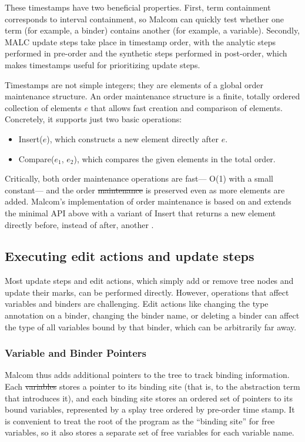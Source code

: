 \documentclass[acmsmall,dvipsnames,10pt,nonacm]{acmart}\settopmatter{printfolios=true} %
\makeatletter
\providecommand{\DIFadd}[1]{{\protect\color{blue}\uwave{#1}}} %
\providecommand{\DIFdel}[1]{{\protect\color{red}\sout{#1}}} %
\providecommand{\DIFaddbegin}{} %
\providecommand{\DIFaddend}{} %
\providecommand{\DIFdelbegin}{} %
\providecommand{\DIFdelend}{} %
\newcommand{\DIFscaledelfig}{0.5}
\newlength{\DIFdelgraphicswidth} %
\newlength{\DIFdelgraphicsheight} %
\newcommand{\DIFaddincludegraphics}[2][]{{\color{blue}\fbox{\DIFOincludegraphics[#1]{#2}}}} %
\newcommand{\DIFdelincludegraphics}[2][]{%
\sbox{\DIFdelgraphicsbox}{\DIFOincludegraphics[#1]{#2}}%
\settoboxwidth{\DIFdelgraphicswidth}{\DIFdelgraphicsbox} %
\settoboxtotalheight{\DIFdelgraphicsheight}{\DIFdelgraphicsbox} %
\scalebox{\DIFscaledelfig}{%
\parbox[b]{\DIFdelgraphicswidth}{\usebox{\DIFdelgraphicsbox}\\[-\baselineskip] \rule{\DIFdelgraphicswidth}{0em}}\llap{\resizebox{\DIFdelgraphicswidth}{\DIFdelgraphicsheight}{%
\setlength{\unitlength}{\DIFdelgraphicswidth}%
\begin{picture}(1,1)%
\thicklines\linethickness{2pt} %
{\color[rgb]{1,0,0}\put(0,0){\framebox(1,1){}}}%
{\color[rgb]{1,0,0}\put(0,0){\line( 1,1){1}}}%
{\color[rgb]{1,0,0}\put(0,1){\line(1,-1){1}}}%
\end{picture}%
}\hspace*{3pt}}} %
} %
\DeclareRobustCommand{\DIFaddbegin}{\DIFOaddbegin \let\includegraphics\DIFaddincludegraphics} %
\DeclareRobustCommand{\DIFaddend}{\DIFOaddend \let\includegraphics\DIFOincludegraphics} %
\DeclareRobustCommand{\DIFdelbegin}{\DIFOdelbegin \let\includegraphics\DIFdelincludegraphics} %
\DeclareRobustCommand{\DIFdelend}{\DIFOaddend \let\includegraphics\DIFOincludegraphics} %
\let\sout@orig\sout %
\renewcommand{\sout}[1]{\ifmmode\text{\sout@orig{\ensuremath{#1}}}\else\sout@orig{#1}\fi} %
\makeatother
\begin{document}
These timestamps have two beneficial properties. First, term containment corresponds to interval containment, so Malcom can quickly test whether one term (for example, a binder) contains another (for example, a variable). Secondly, MALC update steps take place in timestamp order, with the analytic steps performed in pre-order and the synthetic steps performed in post-order, which makes timestamps useful for prioritizing update steps.

Timestamps are not simple integers;
  they are elements of a global
  order maintenance structure.
An order maintenance structure is
  a finite, totally ordered collection of elements $e$
  that allows fast creation and comparison of elements.
Concretely, it supports just two basic operations:
\begin{itemize}
    \item Insert($e$),
      which constructs a new element directly after $e$. 
    \item Compare($e_1$, $e_2$), which compares the given elements in the total order. 
\end{itemize}
Critically, both order maintenance operations are fast---%
  O(1) with a small constant---%
  and the order \DIFdelbegin \DIFdel{maintenance }\DIFdelend is preserved even as
  more elements are added.
Malcom's implementation of order maintenance
  is based on \citet{DBLP:conf/esa/BenderCDFZ02}
  and extends the minimal API above
  with a variant of Insert that returns a new element
  directly before, instead of after, another \DIFaddbegin \DIFadd{element}\DIFaddend .

\subsection{Executing edit actions and update steps}

Most update steps and edit actions, which simply add or remove tree nodes and update their marks, can be performed directly.
However, operations that affect variables and binders are challenging. Edit actions like changing the type annotation on a binder, changing the binder name, or deleting a binder can affect the type of all variables bound by that binder, which can be arbitrarily far away.

\subsubsection{Variable and Binder Pointers}

Malcom thus adds additional pointers to the tree to track binding information. Each \DIFdelbegin \DIFdel{variables }\DIFdelend \DIFaddbegin \DIFadd{variable }\DIFaddend stores a pointer to its binding site (that is, to the abstraction term that introduces it), and each binding site stores an ordered set of pointers to its bound variables, represented by a splay tree ordered by pre-order time stamp. It is convenient to treat the root of the program as the ``binding site'' for free variables, so it also stores a separate set of free variables for each variable name.
\end{document}
